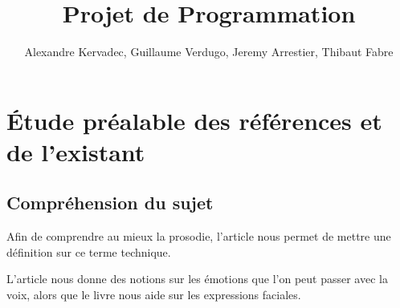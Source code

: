 \documentclass[a4paper,twoside,10pt]{report}
\begin{document}
\pagestyle{empty} %



\title{Projet de Programmation}
\author{Alexandre Kervadec, Guillaume Verdugo, Jeremy Arrestier, Thibaut Fabre}
\maketitle



\tableofcontents %
\cleardoublepage %

\pagestyle{plain} %







\chapter{Étude préalable des références et de l'existant}\label{ref_existant}


\section{Compréhension du sujet}\label{comprehension_sujet}

Afin de comprendre au mieux la prosodie, l'article \cite{bachorowski1999vocal} nous permet de mettre une définition sur ce terme technique.

L'article \cite{auberge2002prosodie} nous donne des notions sur les émotions que l'on peut passer avec la voix, alors que le livre \cite{ekman2003unmasking} nous aide sur les expressions faciales.
\end{document}
